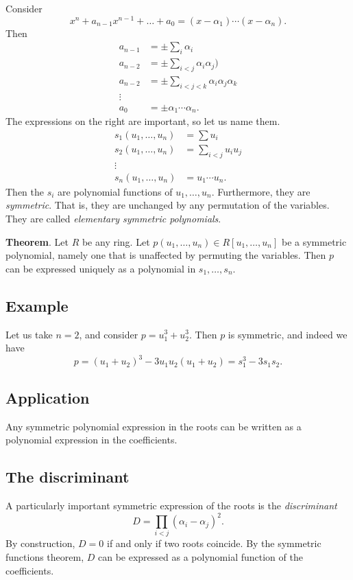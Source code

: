 \documentclass[11pt]{article}
\begin{document}
Consider
\[ x^{n} + a_{n-1}x^{n-1} + \dots + a_{0} = (x-\alpha_1) \cdots (x-\alpha_n).\]
Then
\begin{align*}
a_{n-1} &= \pm \sum_{i} \alpha_{i}\\
a_{n-2} &= \pm \sum_{i < j} \alpha_{i} \alpha_{j})\\
a_{n-2} &= \pm \sum_{i<j<k} \alpha_{i}\alpha_{j}\alpha_{k}\\
\vdots\\
a_{0} &= \pm \alpha_{1} \cdots \alpha_{n}.
\end{align*}
The expressions on the right are important, so let us name them.
\begin{align*}
 s_{1}(u_{1}, \dots, u_{n}) &= \sum u_{i}\\
 s_{2}(u_{1}, \dots,u_{n}) &= \sum_{i<j}u_{i}u_{j}\\
\vdots \\
s_{n}(u_{1}, \dots, u_{n}) &= u_{1} \cdots u_{n}.
\end{align*}
Then the \(s_i\) are polynomial functions of \(u_{1}, \dots, u_{n}\).
Furthermore, they are \emph{symmetric}.
That is, they are unchanged by any permutation of the variables.
They are called \emph{elementary symmetric polynomials}.

\textbf{Theorem}. Let \(R\) be any ring.  Let \(p(u_{1}, \dots, u_{n}) \in R[u_{1}, \dots, u_{n}]\) be a symmetric polynomial, namely one that is unaffected by permuting the variables.  Then \(p\) can be expressed uniquely as a polynomial in \(s_{1}, \dots, s_{n}\).
\subsection{Example}
\label{sec:org3b5d23b}
Let us take \(n = 2\), and consider \(p = u_{1}^3 + u_{2}^3\).
Then \(p\) is symmetric, and indeed we have
\[ p = (u_{1}+u_{2})^3 - 3u_{1}u_{2}(u_{1}+u_{2}) = s_{1}^3-3s_{1}s_{2}.\]
\subsection{Application}
\label{sec:org40abb41}
Any symmetric polynomial expression in the roots can be written as a polynomial expression in the coefficients.
\subsection{The discriminant}
\label{sec:org2b8d775}
A particularly important symmetric expression of the roots is the \emph{discriminant}
\[ D = \prod_{i<j} (\alpha_{i} - \alpha_{j})^{2}.\]
By construction, \(D = 0\) if and only if two roots coincide.
By the symmetric functions theorem, \(D\) can be expressed as a polynomial function of the coefficients.
\end{document}
